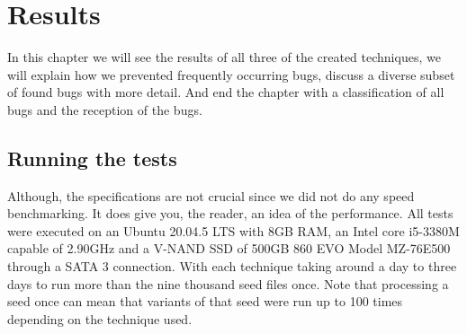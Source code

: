 \chapter{Results}
\label{cha:res}
\label{res:Intro}
In this chapter we will see the results of all three of the created techniques, we will explain how we prevented frequently occurring bugs, discuss a diverse subset of found bugs with more detail. And end the chapter with a classification of all bugs and the reception of the bugs.

\section{Running the tests}
\label{res:RunningTests}
\label{res:Specs}
Although, the specifications are not crucial since we did not do any speed benchmarking. It does give you, the reader, an idea of the performance. All tests were executed on an Ubuntu 20.04.5 LTS with 8GB RAM, an Intel core i5-3380M capable of 2.90GHz and a V-NAND SSD of 500GB 860 EVO Model MZ-76E500 through a SATA 3 connection. With each technique taking around a day to three days to run more than the nine thousand seed files once. Note that processing a seed once can mean that variants of that seed were run up to 100 times depending on the technique used.


